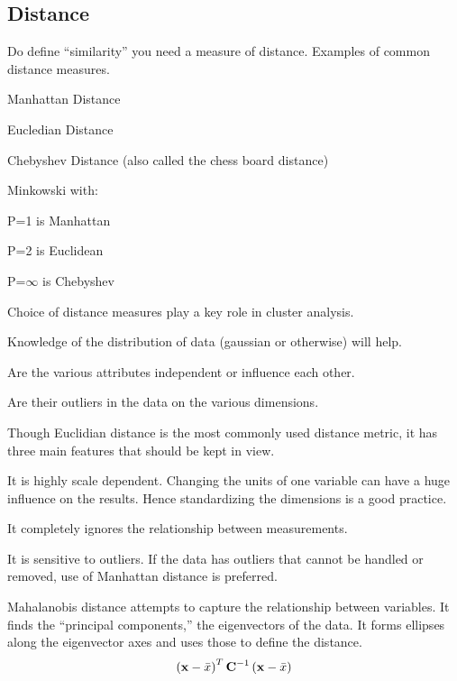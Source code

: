 	\subsection{Distance}
Do define ``similarity'' you need a measure of distance.  Examples of common distance measures.
	\begin{bulletedlist}
		\item Manhattan Distance
		\item Eucledian Distance
		\item Chebyshev Distance (also called the chess board distance)
		\item Minkowski with:
		\begin{bulletedlist}
			\item P=1 is Manhattan
			\item P=2 is Euclidean
			\item P=$\infty$ is Chebyshev
		\end{bulletedlist}
	\end{bulletedlist}

	\begin{bulletedlist}
		\item Choice of distance measures play a key role in cluster analysis.
		\item Knowledge of the distribution of data (gaussian or otherwise) will help.
		\item Are the various attributes independent or influence each other.
		\item Are their outliers in the data on the various dimensions.
		\item Though Euclidian distance is the most commonly used distance metric, it has three main features that should be kept in view.
		\begin{bulletedlist}
			\item It is highly scale dependent. Changing the units of one variable can have a huge influence on the results. Hence standardizing the dimensions is a good practice.
			\item It completely ignores the relationship between measurements.
			\item It is sensitive to outliers. If the data has outliers that cannot be handled or removed, use of Manhattan distance is preferred.
		\end{bulletedlist}
	\end{bulletedlist}


Mahalanobis distance attempts to capture the relationship between variables.  It finds the ``principal components,'' the eigenvectors of the data.  It forms ellipses along the eigenvector axes and uses those to define the distance.
	\begin{equation}
		\left(\mbox{\boldmath$\mathrm{x}$}-\bar{x}\right)^T \mbox{\boldmath$\mathrm{C}$}^{-1}\left(\mbox{\boldmath$\mathrm{x}$}-\bar{x}\right)
	\end{equation}
	\begin{mathwhere}
	\end{mathwhere}

